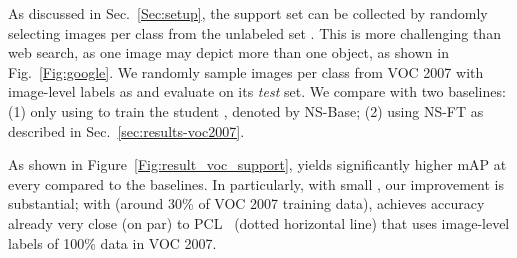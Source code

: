 {As discussed in Sec.~\ref{Sec:setup}, the support set  can be collected by randomly selecting  images per class from the unlabeled set . This is more challenging than web search, as one image may depict more than one object, as shown in Fig.~\ref{Fig:google}. We randomly sample  images per class from
	VOC 2007 with image-level labels as  and evaluate on its \emph{test} set.} 
We compare \ours with two baselines: (1) only using  to train the student , denoted by NS-Base; (2) using NS-FT as described in Sec.~\ref{sec:results-voc2007}.

{As shown in Figure~\ref{Fig:result_voc_support}, \ours yields significantly higher mAP at every  compared to the baselines. In particularly, with small , our improvement is substantial; with  (around 30\% of VOC 2007 training data), \ours achieves accuracy already very close (on par) to PCL~\cite{tang2018pami} (dotted horizontal line) that uses image-level labels of 100\% data in VOC 2007.}


